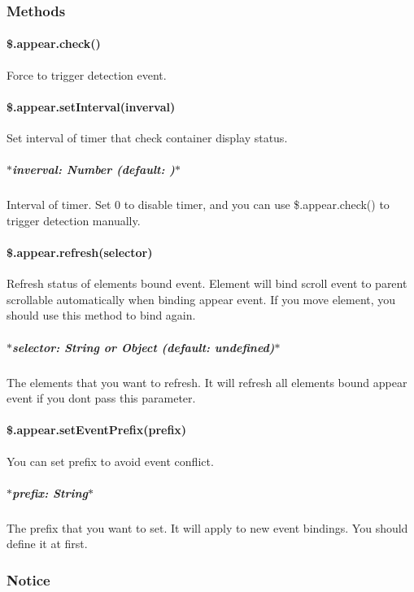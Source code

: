 \subsubsection*{Methods}

\paragraph*{\$.appear.\+check()}

Force to trigger detection event.

\paragraph*{\$.appear.\+set\+Interval(inverval)}

Set interval of timer that check container display status.

\subparagraph*{$\ast$inverval\+: {\ttfamily Number} (default\+: {})$\ast$}

Interval of timer. Set 0 to disable timer, and you can use {\ttfamily \$.appear.\+check()} to trigger detection manually.

\paragraph*{\$.appear.\+refresh(selector)}

Refresh status of elements bound event. Element will bind scroll event to parent scrollable automatically when binding appear event. If you move element, you should use this method to bind again.

\subparagraph*{$\ast$selector\+: {\ttfamily String} or {\ttfamily Object} (default\+: {\ttfamily undefined})$\ast$}

The elements that you want to refresh. It will refresh all elements bound appear event if you don\textquotesingle{}t pass this parameter.

\paragraph*{\$.appear.\+set\+Event\+Prefix(prefix)}

You can set prefix to avoid event conflict.

\subparagraph*{$\ast$prefix\+: {\ttfamily String}$\ast$}

The prefix that you want to set. It will apply to new event bindings. You should define it at first.

\subsubsection*{Notice}


